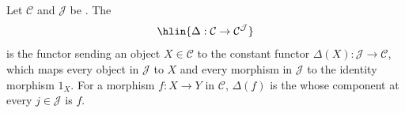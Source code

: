 \begin{definition} \label{definition:diagonal_functor_from_a_category_to_a_diagram_category_of_the_category}
    Let $\mathcal{C}$ and $\mathcal{J}$ be .
    The 
    $$\hlin{\Delta: \mathcal{C} \to \mathcal{C}^{\mathcal{J}}}$$
    is the functor sending an object $X \in \mathcal{C}$ to the constant functor $\Delta(X): \mathcal{J} \to \mathcal{C}$, which maps every object in $\mathcal{J}$ to $X$ and every morphism in $\mathcal{J}$ to the identity morphism $1_X$.
    For a morphism $f: X \to Y$ in $\mathcal{C}$, $\Delta(f)$ is the  whose component at every $j \in \mathcal{J}$ is $f$.
\end{definition}